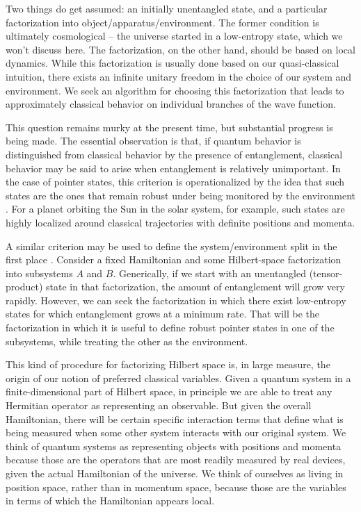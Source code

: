 \documentclass[12pt,english]{article}
\begin{document}
Two things do get assumed: an initially unentangled state, and a particular factorization into object/apparatus/environment.
The former condition is ultimately cosmological -- the universe started in a low-entropy state, which we won't discuss here.
The factorization, on the other hand, should be based on local dynamics.
While this factorization is usually done based on our quasi-classical intuition, there exists an infinite unitary freedom in the choice of our system and environment. 
We seek an algorithm for choosing this factorization that leads to approximately classical behavior on individual branches of the wave function.

This question remains murky at the present time, but substantial progress is being made.
The essential observation is that, if quantum behavior is distinguished from classical behavior by the presence of entanglement, classical behavior may be said to arise when entanglement is relatively unimportant.
In the case of pointer states, this criterion is operationalized by the idea that such states are the ones that remain robust under being monitored by the environment \cite{Zurek:1981xq}.
For a planet orbiting the Sun in the solar system, for example, such states are highly localized around classical trajectories with definite positions and momenta.

A similar criterion may be used to define the system/environment split in the first place \cite{Tegmark:2014kka,mereology}.
Consider a fixed Hamiltonian and some Hilbert-space factorization into subsystems $A$ and $B$. 
Generically, if we start with an unentangled (tensor-product) state in that factorization, the amount of entanglement will grow very rapidly.
However, we can seek the factorization in which there exist low-entropy states for which entanglement grows at a minimum rate.
That will be the factorization in which it is useful to define robust pointer states in one of the subsystems, while treating the other as the environment.

This kind of procedure for factorizing Hilbert space is, in large measure, the origin of our notion of preferred classical variables.
Given a quantum system in a finite-dimensional part of Hilbert space, in principle we are able to treat any Hermitian operator as representing an observable.
But given the overall Hamiltonian, there will be certain specific interaction terms that define what is being measured when some other system interacts with our original system.
We think of quantum systems as representing objects with positions and momenta because those are the operators that are most readily measured by real devices, given the actual Hamiltonian of the universe.
We think of ourselves as living in position space, rather than in momentum space, because those are the variables in terms of which the Hamiltonian appears local.
\end{document}

